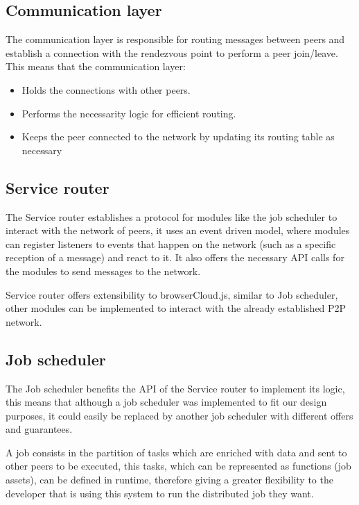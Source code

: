 \subsection{Communication layer}

The communication layer is responsible for routing messages between peers and establish a connection with the rendezvous point to perform a peer join/leave. This means that the communication layer:

\begin{itemize}
    \item Holds the connections with other peers.
    \item Performs the necessarity logic for efficient routing.
    \item Keeps the peer connected to the network by updating its routing table as necessary
\end{itemize}

\subsection{Service router}

The Service router establishes a protocol for modules like the job scheduler to interact with the network of peers, it uses an event driven model, where modules can register listeners to events that happen on the network (such as a specific reception of a message) and react to it. It also offers the necessary API calls for the modules to send messages to the network.

Service router offers extensibility to browserCloud.js, similar to Job scheduler, other modules can be implemented to interact with the already established P2P network.

\subsection{Job scheduler}

The Job scheduler benefits the API of the Service router to implement its logic, this means that although a job scheduler was implemented to fit our design purposes, it could easily be replaced by another job scheduler with different offers and guarantees.

A job consists in the partition of tasks which are enriched with data and sent to other peers to be executed, this tasks, which can be represented as functions (job assets), can be defined in runtime, therefore giving a greater flexibility to the developer that is using this system to run the distributed job they want.

